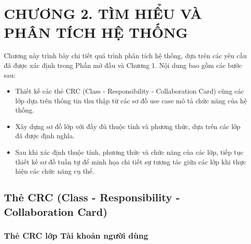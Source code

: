 \section*{CHƯƠNG 2. TÌM HIỂU VÀ PHÂN TÍCH HỆ THỐNG}
\setcounter{section}{2}
\setcounter{subsection}{0} %
\setcounter{table}{0} %
\setcounter{figure}{0} %
Chương này trình bày chi tiết quá trình phân tích hệ thống, dựa trên các yêu cầu đã được xác định trong Phần mở đầu và Chương 1. Nội dung bao gồm các bước sau:\begin{adjustwidth}{1.5em}{}
	\begin{itemize}
		\item Thiết kế các thẻ CRC (Class - Responsibility - Collaboration Card) \cite{crc} cùng các lớp dựa trên thông tin thu thập từ các sơ đồ use case mô tả chức năng của hệ thống.
		\item Xây dựng sơ đồ lớp với đầy đủ thuộc tính và phương thức, dựa trên các lớp đã được định nghĩa.
		\item Sau khi xác định thuộc tính, phương thức và chức năng của các lớp, tiếp tục thiết kế sơ đồ tuần tự để minh họa chi tiết sự tương tác giữa các lớp khi thực hiện các chức năng cụ thể.
	\end{itemize}
\end{adjustwidth}
\subsection{Thẻ CRC (Class - Responsibility - Collaboration Card)}

\subsubsection{Thẻ CRC lớp Tài khoản người dùng}

